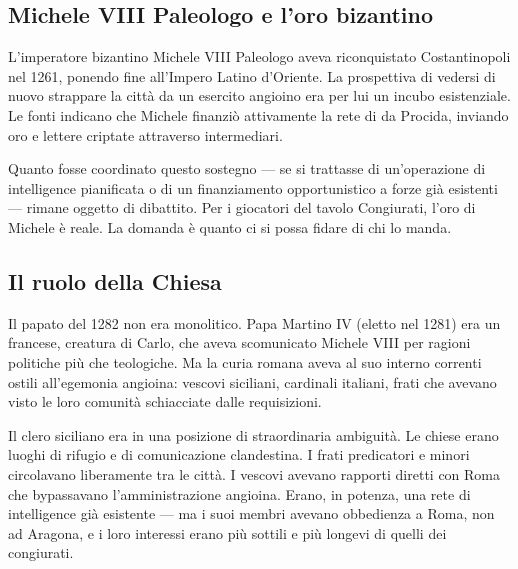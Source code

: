 
\subsection{Michele VIII Paleologo e l'oro bizantino}

L'imperatore bizantino Michele VIII Paleologo aveva riconquistato
Costantinopoli nel 1261, ponendo fine all'Impero Latino d'Oriente. La
prospettiva di vedersi di nuovo strappare la città da un esercito angioino
era per lui un incubo esistenziale. Le fonti indicano che Michele finanziò
attivamente la rete di da Procida, inviando oro e lettere criptate attraverso
intermediari.

Quanto fosse coordinato questo sostegno — se si trattasse di un'operazione
di intelligence pianificata o di un finanziamento opportunistico a forze
già esistenti — rimane oggetto di dibattito. Per i giocatori del tavolo
Congiurati, l'oro di Michele è reale. La domanda è quanto ci si possa
fidare di chi lo manda.

\subsection{Il ruolo della Chiesa}

Il papato del 1282 non era monolitico. Papa Martino IV (eletto nel 1281)
era un francese, creatura di Carlo, che aveva scomunicato Michele VIII
per ragioni politiche più che teologiche. Ma la curia romana aveva al
suo interno correnti ostili all'egemonia angioina: vescovi siciliani,
cardinali italiani, frati che avevano visto le loro comunità schiacciate
dalle requisizioni.

Il clero siciliano era in una posizione di straordinaria ambiguità. Le
chiese erano luoghi di rifugio e di comunicazione clandestina. I frati
predicatori e minori circolavano liberamente tra le città. I vescovi
avevano rapporti diretti con Roma che bypassavano l'amministrazione
angioina. Erano, in potenza, una rete di intelligence già esistente —
ma i suoi membri avevano obbedienza a Roma, non ad Aragona, e i loro
interessi erano più sottili e più longevi di quelli dei congiurati.

